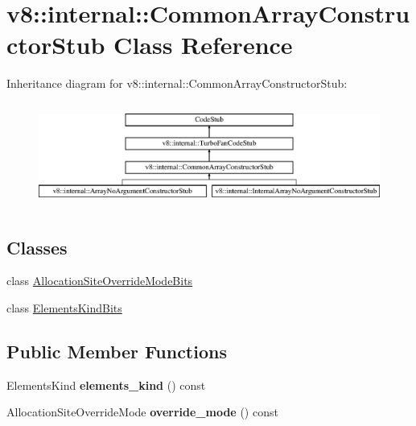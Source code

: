 \hypertarget{classv8_1_1internal_1_1_common_array_constructor_stub}{}\section{v8\+:\+:internal\+:\+:Common\+Array\+Constructor\+Stub Class Reference}
\label{classv8_1_1internal_1_1_common_array_constructor_stub}
Inheritance diagram for v8\+:\+:internal\+:\+:Common\+Array\+Constructor\+Stub\+:\begin{figure}[H]
\begin{center}
\leavevmode
\includegraphics[height=3.456790cm]{classv8_1_1internal_1_1_common_array_constructor_stub}
\end{center}
\end{figure}
\subsection*{Classes}
\begin{DoxyCompactItemize}
\item 
class \hyperlink{classv8_1_1internal_1_1_common_array_constructor_stub_1_1_allocation_site_override_mode_bits}{Allocation\+Site\+Override\+Mode\+Bits}
\item 
class \hyperlink{classv8_1_1internal_1_1_common_array_constructor_stub_1_1_elements_kind_bits}{Elements\+Kind\+Bits}
\end{DoxyCompactItemize}
\subsection*{Public Member Functions}
\begin{DoxyCompactItemize}
\item 
Elements\+Kind {\bfseries elements\+\_\+kind} () const \hypertarget{classv8_1_1internal_1_1_common_array_constructor_stub_a90603df4931b86da8ef8734137199b40}{}\label{classv8_1_1internal_1_1_common_array_constructor_stub_a90603df4931b86da8ef8734137199b40}

\item 
Allocation\+Site\+Override\+Mode {\bfseries override\+\_\+mode} () const \hypertarget{classv8_1_1internal_1_1_common_array_constructor_stub_ad7baac3ade05739a9443b30f3eaa5483}{}\label{classv8_1_1internal_1_1_common_array_constructor_stub_ad7baac3ade05739a9443b30f3eaa5483}

\end{DoxyCompactItemize}
